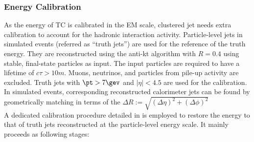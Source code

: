 



\subsubsection{Energy Calibration} \label{sec::objDef::jets::calib}
As the energy of TC is calibrated in the EM scale, clustered jet needs extra calibration to account for the hadronic interaction activity. Particle-level jets in simulated events (referred as ``truth jets'') are used for the reference of the truth energy. They are reconstructed using the anti-kt algorithm with $R=0.4$ using stable, final-state particles as input. The input particles are required to have a lifetime of $c\tau > 10m$. Muons, neutrinos, and particles from pile-up activity are excluded. Truth jets with $\pt>7\gev$ and $|\eta|<4.5$ are used for the calibration. In simulated events, corresponding reconstructed calorimeter jets can be found by geometrically matching in  terms of the $\Delta R := \sqrt{(\Delta \eta)^2+(\Delta \phi)^2}$ \\

A dedicated calibration procedure detailed in \cite{144_JESmeas_2015data} is employed
to restore the energy to that of truth jets reconstructed at the particle-level energy scale. It mainly proceeds as following stages:


